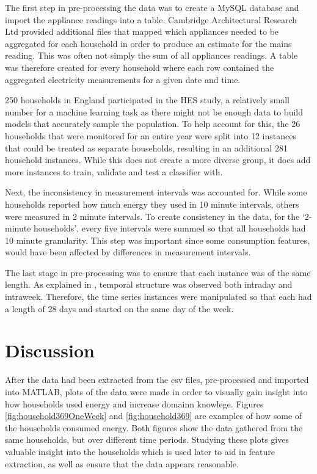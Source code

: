 The first step in pre-processing the data was to create a MySQL database and import the appliance readings into a table. Cambridge Architectural Research Ltd provided additional files that mapped which appliances needed to be aggregated for each household in order to produce an estimate for the mains reading. This was often not simply the sum of all appliances readings. A table was therefore created for every household where each row contained the aggregated electricity measurements for a given date and time. 

250 households in England participated in the HES study, a relatively small number for a machine learning task as there might not be enough data to build models that accurately sample the population. To help account for this, the 26 households that were monitored for an entire year were split into 12 instances that could be treated as separate households, resulting in an additional 281 household instances. While this does not create a more diverse group, it does add more instances to train, validate and test a classifier with.

Next, the inconsistency in measurement intervals was accounted for. While some households reported how much energy they used in 10 minute intervals, others were measured in 2 minute intervals. To create consistency in the data, for the `2-minute households', every five intervals were summed so that all households had 10 minute granularity. This step was important since some consumption features, would have been affected by differences in measurement intervals.

The last stage in pre-processing was to ensure that each instance was of the same length. As explained in \fourierSection, temporal structure was observed both intraday and intraweek. Therefore, the time series instances were manipulated so that each had a length of 28 days and started on the same day of the week.

\section{Discussion}

After the data had been extracted from the csv files, pre-processed and imported into MATLAB, plots of the data were made in order to visually gain insight into how households used energy and increase domainn knowlege. Figures \ref{fig:household369OneWeek} and \ref{fig:household369} are examples of how some of the households consumed energy. Both figures show the data gathered from the same households, but over different time periods. Studying these plots gives valuable insight into the households which is used later to aid in feature extraction, as well as ensure that the data appears reasonable. 

